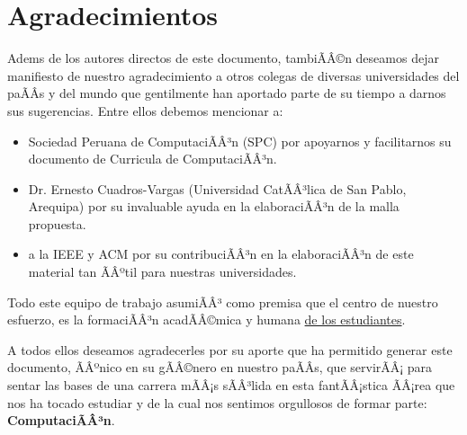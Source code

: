 \chapter*{Agradecimientos}\label{chap:cs-ack}
%

Adem s de los autores directos de este documento, tambiÃÂ©n deseamos dejar manifiesto de nuestro 
agradecimiento a otros colegas de diversas universidades del paÃÂ­s y del mundo que gentilmente 
han aportado parte de su tiempo a darnos sus sugerencias. Entre ellos debemos mencionar a:

\begin{itemize}
\item Sociedad Peruana de ComputaciÃÂ³n (SPC) por apoyarnos y facilitarnos su documento de Curricula de ComputaciÃÂ³n.
\item Dr. Ernesto Cuadros-Vargas (Universidad CatÃÂ³lica de San Pablo, Arequipa) por su invaluable ayuda en la elaboraciÃÂ³n de la malla propuesta. 
\item a la IEEE y ACM por su contribuciÃÂ³n en la elaboraciÃÂ³n de este material tan ÃÂºtil para nuestras universidades.
\end{itemize}

Todo este equipo de trabajo asumiÃÂ³ como premisa que el centro de nuestro esfuerzo, 
es la formaciÃÂ³n acadÃÂ©mica y humana \underline{de los estudiantes}.

A todos ellos deseamos agradecerles por su aporte que ha permitido generar 
este documento, ÃÂºnico en su gÃÂ©nero en nuestro paÃÂ­s, que servirÃÂ¡ para sentar las 
bases de una carrera mÃÂ¡s sÃÂ³lida en esta fantÃÂ¡stica ÃÂ¡rea que nos ha tocado estudiar y 
de la cual nos sentimos orgullosos de formar parte: \textbf{ComputaciÃÂ³n}.
